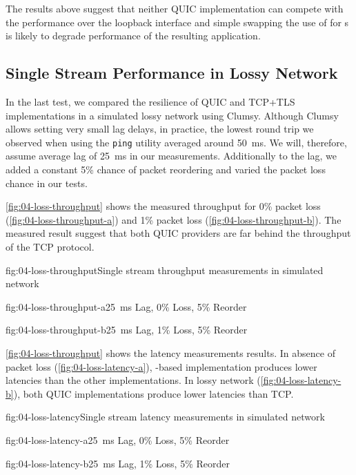 The results above suggest that neither QUIC implementation can compete with the \SslStream{}
performance over the loopback interface and simple swapping the use of \SslStream{} for
\QuicStream{}s is likely to degrade performance of the resulting application.

\subsection{Single Stream Performance in Lossy Network}

In the last test, we compared the resilience of QUIC and TCP+TLS implementations in a simulated
lossy network using Clumsy. Although Clumsy allows setting very small lag delays, in practice, the
lowest round trip we observed when using the \texttt{ping} utility averaged around
\SI{50}{\milli\second}. We will, therefore, assume average lag of \SI{25}{\milli\second} in our
measurements. Additionally to the lag, we added a constant 5\% chance of packet reordering and
varied the packet loss chance in our tests.

\autoref{fig:04-loss-throughput} shows the measured throughput for 0\% packet loss
(\autoref{fig:04-loss-throughput-a}) and 1\% packet loss (\autoref{fig:04-loss-throughput-b}). The
measured result suggest that both QUIC providers are far behind the throughput of the TCP protocol.

\begin{myFigure}{fig:04-loss-throughput}{Single stream throughput measurements in simulated network}
\begin{mySubfigure}{0.49\linewidth}{fig:04-loss-throughput-a}{\SI{25}{\milli\second} Lag, 0\% Loss, 5\% Reorder}
\footnotesize

\end{mySubfigure}
\begin{mySubfigure}{0.49\linewidth}{fig:04-loss-throughput-b}{\SI{25}{\milli\second} Lag, 1\% Loss, 5\% Reorder}
\footnotesize

\end{mySubfigure}
\end{myFigure}

\autoref{fig:04-loss-throughput} shows the latency measurements results. In absence of packet loss
(\autoref{fig:04-loss-latency-a}), \libmsquic{}-based implementation produces lower latencies than
the other implementations. In lossy network (\autoref{fig:04-loss-latency-b}), both QUIC
implementations produce lower latencies than TCP.

\begin{myFigure}{fig:04-loss-latency}{Single stream latency measurements in simulated network}
\begin{mySubfigure}{0.49\linewidth}{fig:04-loss-latency-a}{\SI{25}{\milli\second} Lag, 0\% Loss, 5\% Reorder}
\footnotesize

\end{mySubfigure}
\begin{mySubfigure}{0.49\linewidth}{fig:04-loss-latency-b}{\SI{25}{\milli\second} Lag, 1\% Loss, 5\% Reorder}
\footnotesize

\end{mySubfigure}
\end{myFigure}

